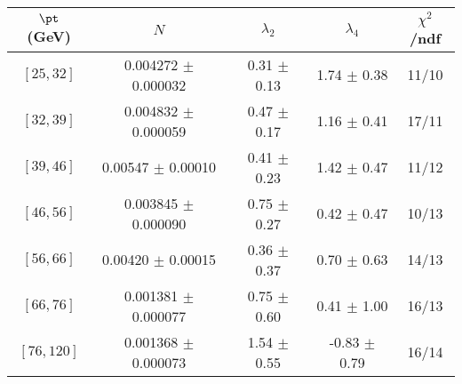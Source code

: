\begin{tabular}{c||c|c|c|c}
$\pt$ (GeV) & $N$ & $\lambda_{2}$ & $\lambda_4$  & $\chi^2$/ndf  \\
\hline
$[25, 32]$ & 0.004272 $\pm$ 0.000032 & 0.31 $\pm$ 0.13 & 1.74 $\pm$ 0.38 & 11/10\\
$[32, 39]$ & 0.004832 $\pm$ 0.000059 & 0.47 $\pm$ 0.17 & 1.16 $\pm$ 0.41 & 17/11\\
$[39, 46]$ & 0.00547 $\pm$ 0.00010 & 0.41 $\pm$ 0.23 & 1.42 $\pm$ 0.47 & 11/12\\
$[46, 56]$ & 0.003845 $\pm$ 0.000090 & 0.75 $\pm$ 0.27 & 0.42 $\pm$ 0.47 & 10/13\\
$[56, 66]$ & 0.00420 $\pm$ 0.00015 & 0.36 $\pm$ 0.37 & 0.70 $\pm$ 0.63 & 14/13\\
$[66, 76]$ & 0.001381 $\pm$ 0.000077 & 0.75 $\pm$ 0.60 & 0.41 $\pm$ 1.00 & 16/13\\
$[76, 120]$ & 0.001368 $\pm$ 0.000073 & 1.54 $\pm$ 0.55 & -0.83 $\pm$ 0.79 & 16/14\\
\end{tabular}
